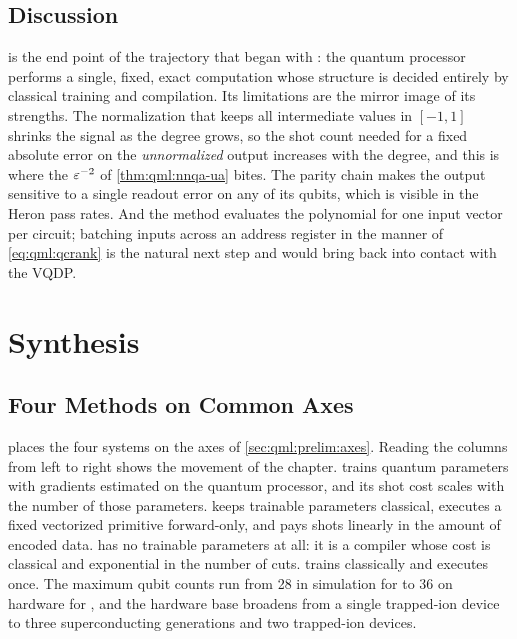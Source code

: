 \subsection{Discussion}\label{sec:qml:nnqa:discussion}

\nnqa{} is the end point of the trajectory that began with \qpie{}: the quantum processor performs a single, fixed, exact computation whose structure is decided entirely by classical training and compilation. Its limitations are the mirror image of its strengths. The normalization that keeps all intermediate values in $[-1,1]$ shrinks the signal as the degree grows, so the shot count needed for a fixed absolute error on the \emph{unnormalized} output increases with the degree, and this is where the $\varepsilon^{-2}$ of \cref{thm:qml:nnqa-ua} bites. The parity chain makes the output sensitive to a single readout error on any of its qubits, which is visible in the Heron pass rates. And the method evaluates the polynomial for one input vector per circuit; batching inputs across an address register in the manner of \cref{eq:qml:qcrank} is the natural next step and would bring \nnqa{} back into contact with the VQDP.

\section{Synthesis}\label{sec:qml:synthesis}

\subsection{Four Methods on Common Axes}\label{sec:qml:synthesis:axes}

 places the four systems on the axes of \cref{sec:qml:prelim:axes}. Reading the columns from left to right shows the movement of the chapter. \qpie{} trains quantum parameters with gradients estimated on the quantum processor, and its shot cost scales with the number of those parameters. \vqt{} keeps trainable parameters classical, executes a fixed vectorized primitive forward-only, and pays shots linearly in the amount of encoded data. \shardq{} has no trainable parameters at all: it is a compiler whose cost is classical and exponential in the number of cuts. \nnqa{} trains classically and executes once. The maximum qubit counts run from 28 in simulation for \qpie{} to 36 on hardware for \nnqa{}, and the hardware base broadens from a single trapped-ion device to three superconducting generations and two trapped-ion devices.

